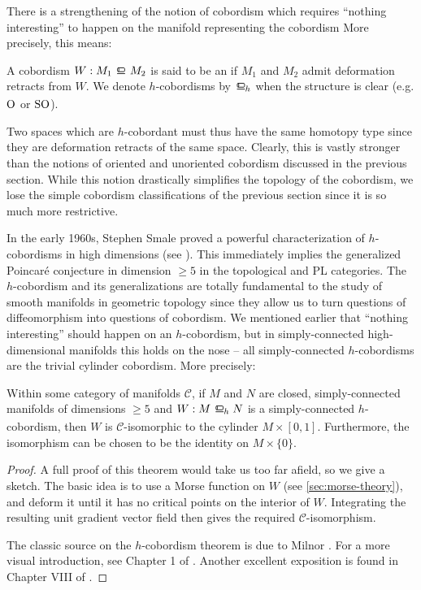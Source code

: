 There is a strengthening of the notion of cobordism which requires ``nothing interesting'' to happen on the manifold representing the cobordism
More precisely, this means: 
\begin{definition}
	A cobordism $W : M_1\bord M_2$ is said to be an  if $M_1$ and $M_2$ admit deformation retracts from $W$. We denote $h$-cobordisms by $\hbord$ when the structure is clear (e.g. $\mathrm{O}$ or $\mathrm{SO}$).
\end{definition}

Two spaces which are $h$-cobordant must thus have the same homotopy type since they are deformation retracts of the same space. Clearly, this is vastly stronger than the notions of oriented and unoriented cobordism discussed in the previous section. While this notion drastically simplifies the topology of the cobordism, we lose the simple cobordism classifications of the previous section since it is so much more restrictive. 

In the early 1960s, Stephen Smale proved a powerful characterization of $h$-cobordisms in high dimensions (see \cite{smale1961generalized}). This immediately implies the generalized Poincar\'e conjecture in dimension $\geq 5$ in the topological and PL categories. The $h$-cobordism and its generalizations are totally fundamental to the study of smooth manifolds in geometric topology since they allow us to turn questions of diffeomorphism into questions of cobordism.
We mentioned earlier that ``nothing interesting'' should happen on an $h$-cobordism, but in simply-connected high-dimensional manifolds this holds on the nose -- all simply-connected $h$-cobordisms are the trivial cylinder cobordism. More precisely:

\begin{theorem}[$h$-cobordism]\label{thm:h-cobordism}
	Within some category of manifolds $\mathscr{C}$, if $M$ and $N$ are closed, simply-connected manifolds of dimensions $\geq 5$ and $W : M \hbord N$ is a simply-connected $h$-cobordism, then $W$ is $\mathscr{C}$-isomorphic to the cylinder $M\times [0,1]$. Furthermore, the isomorphism can be chosen to be the identity on $M\times \{0\}$.
\end{theorem}
\begin{proof}
	A full proof of this theorem would take us too far afield, so we give a sketch. The basic idea is to use a Morse function on $W$ (see \cref{sec:morse-theory}), and deform it until it has no critical points on the interior of $W$. Integrating the resulting unit gradient vector field then gives the required $\mathscr{C}$-isomorphism.

	The classic source on the $h$-cobordism theorem is due to Milnor \cite{milnor1965hcobordism}. For a more visual introduction, see Chapter 1 of \cite{scorpan2005wild}. Another excellent exposition is found in Chapter VIII of \cite{kosinski1993differential}.
\end{proof}

